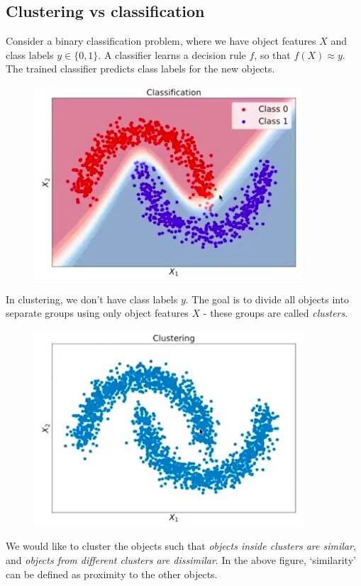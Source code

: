 \minirule

\subsection{Clustering vs classification}
Consider a binary classification problem, where we have object features $X$ and class labels $y \in \{0,1\}$. A classifier learns a decision rule $f$, so that $f(X) \approx y$. The trained classifier predicts class labels for the new objects.
\begin{figure}[H]
\centering
\includegraphics[scale=0.4]{supervisedclassifier.png}
\end{figure}
In clustering, we don't have class labels $y$. The goal is to divide all objects into separate groups using only object features $X$ - these groups are called \textit{clusters}. 
\begin{figure}[H]
\centering
\includegraphics[scale=0.4]{clusterclassification.png}
\end{figure}
We would like to cluster the objects such that \textit{objects inside clusters are similar}, and \textit{objects from different clusters are dissimilar}. In the above figure, `similarity' can be defined as proximity to the other objects.\\

